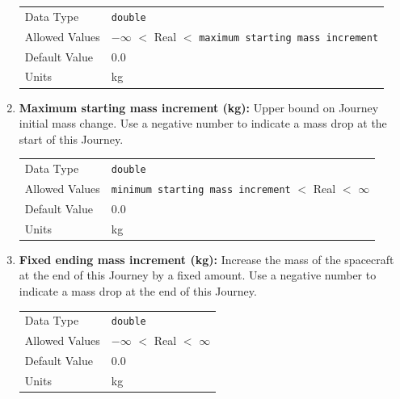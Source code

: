 \begin{enumerate}
            \begin{table}[H]
                \hspace{2cm}
                \begin{tabular}{ll}
                Data Type & \verb|double| \\
                Allowed Values & $-\infty$ $<$ Real $<$ \verb|maximum starting mass increment| \\
                Default Value & 0.0 \\
                Units & kg 
                \end{tabular}
            \end{table}

        \item \textbf{Maximum starting mass increment (kg):} Upper bound on Journey initial mass change. Use a negative number to indicate a mass drop at the start of this Journey. 
    
            \begin{table}[H]
                \hspace{2cm}
                \begin{tabular}{ll}
                Data Type & \verb|double| \\
                Allowed Values & \verb|minimum starting mass increment| $<$ Real $<$ $\infty$ \\
                Default Value & 0.0 \\
                Units & kg 
                \end{tabular}
            \end{table}

    \item \textbf{Fixed ending mass increment (kg):} Increase the mass of the spacecraft at the end of this Journey by a fixed amount. Use a negative number to indicate a mass drop at the end of this Journey. 
    
        \begin{table}[H]
            \hspace{2cm}
            \begin{tabular}{ll}
            Data Type & \verb|double| \\
            Allowed Values & $-\infty$ $<$ Real $<$ $\infty$ \\
            Default Value & 0.0 \\
            Units & kg 
            \end{tabular}
        \end{table}
   


\end{enumerate}
